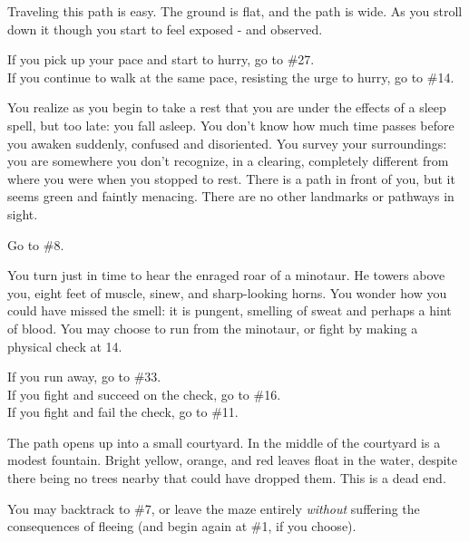 \documentclass[green]{gl2018}
\begin{document}
\begin{large}
\begin{location}{34}
\begin{fromhere}
\end{fromhere}
\end{location}
\begin{location}{35}
Traveling this path is easy. The ground is flat, and the path is wide. As you stroll down it though you start to feel exposed - and observed. 
\begin{fromhere}If you pick up your pace and start to hurry, go to \#27.\\
 If you continue to walk at the same pace, resisting the urge to hurry, go to \#14.
\end{fromhere}
\end{location}
\begin{location}{36}
You realize as you begin to take a rest that you are under the effects of a sleep spell, but too late: you fall asleep.  You don't know how much time passes before you awaken suddenly, confused and disoriented.  You survey your surroundings: you are somewhere you don't recognize, in a clearing, completely different from where you were when you stopped to rest.  There is a path in front of you, but it seems green and faintly menacing.  There are no other landmarks or pathways in sight.
\begin{fromhere}Go to \#8.\end{fromhere}
\end{location}
\begin{location}{37}
You turn just in time to hear the enraged roar of a minotaur.  He towers above you, eight feet of muscle, sinew, and sharp-looking horns.  You wonder how you could have missed the smell: it is pungent, smelling of sweat and perhaps a hint of blood.  You may choose to run from the minotaur, or fight by making a physical check at 14.
\begin{fromhere}
  If you run away, go to \#33.\\
If you fight and succeed on the check, go to \#16. \\
 If you fight and fail the check, go to \#11.
\end{fromhere}
\end{location}
\begin{location}{38}
The path opens up into a small courtyard. In the middle of the courtyard is a modest fountain.  Bright yellow, orange, and red leaves float in the water, despite there being no trees nearby that could have dropped them. This is a dead end.
\begin{fromhere} You may backtrack to \#7, or leave the maze entirely {\em without} suffering the consequences of fleeing (and begin again at \#1, if you choose).

\end{fromhere}
\end{location}
\end{large}
\end{document}
